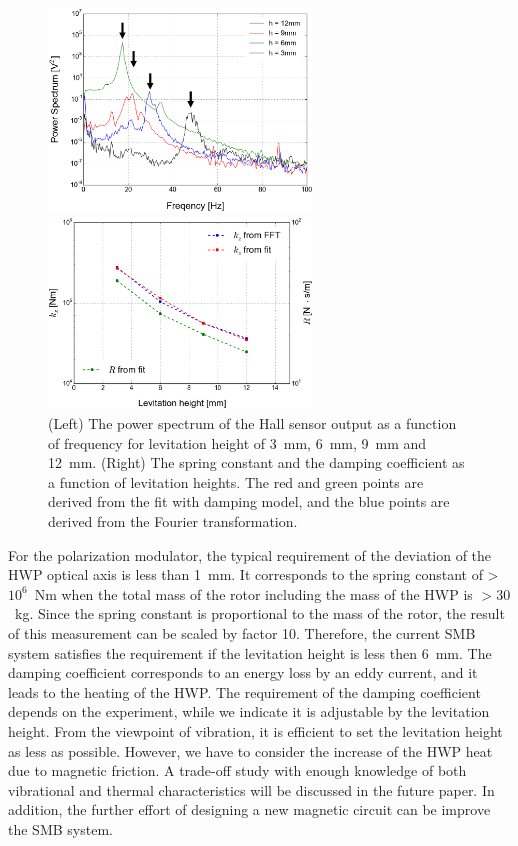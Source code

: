 \documentclass[a4paper]{jpconf}
\begin{document}
\begin{figure}[htbp]
  \centering
  \begin{minipage}{0.45\hsize}
    \includegraphics[width=70mm]{vibration_fft_B.eps}
  \end{minipage}
  \begin{minipage}{0.45\hsize}
    \centering
    \includegraphics[width=70mm]{SpringConstant.eps}
  \end{minipage}
  \caption{(Left) The power spectrum of the Hall sensor output as a function of frequency for levitation height of 3~mm, 6~mm, 9~mm and 12~mm.
    (Right) The spring constant and the damping coefficient as a function of levitation heights.
    The red and green points are derived from the fit with damping model, and the blue points are derived from the Fourier transformation.}
  \label{fig:fft}
\end{figure}

For the polarization modulator, the typical requirement of the deviation of the HWP optical axis is less than 1~mm.
It corresponds to the spring constant of >$10^{6}$~Nm when the total mass of the rotor including the mass of the HWP is $>30$~kg.
Since the spring constant is proportional to the mass of the rotor, the result of this measurement can be scaled by factor 10.
Therefore, the current SMB system satisfies the requirement if the levitation height is less then 6~mm.
The damping coefficient corresponds to an energy loss by an eddy current, and it leads to the heating of the HWP.
The requirement of the damping coefficient depends on the experiment, while we indicate it is adjustable by the levitation height.
From the viewpoint of vibration, it is efficient to set the levitation height as less as possible.
However, we have to consider the increase of the HWP heat due to magnetic friction.
A trade-off study with enough knowledge of both vibrational and thermal characteristics will be discussed in the future paper.
In addition, the further effort of designing a new magnetic circuit can be improve the SMB system.
\end{document}
